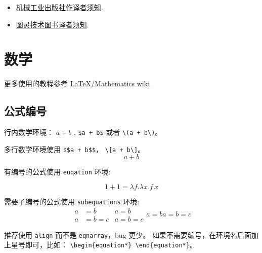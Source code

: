 \begin{itemize}
\item \href{http://www.cmpbook.com/index.php?id=131}{机械工业出版社作译者须知}.
\item \href{http://www.ituring.com.cn/article/501527}{图灵技术图书译者须知}.
\end{itemize}

\section{数学}

更多使用的教程参考 \href{https://en.wikibooks.org/wiki/LaTeX/Mathematics}{\LaTeX/Mathematics wiki}

\subsection{公式编号}

行内数学环境： $a + b$ , \verb!$a + b$! 或者 \verb!\(a + b\)!。

多行数学环境使用 \verb!$$a + b$$!，  \verb!\[a + b\]!。
$$a + b$$

有编号的公式使用 \texttt{euqation} 环境:

\begin{equation}\label{euqation:one_plus_one}
    1 + 1 = \lambda f . \lambda x . f\, x
\end{equation}


需要子编号的公式使用 \texttt{subequations} 环境:
\begin{subequations}
    \begin{align} %
        a &= b \\
        a &= b = c
    \end{align}
    \begin{gather}
        a = b\\
        a = b = c
    \end{gather}
    \begin{equation}
        a = b
    \end{equation}
    \begin{equation}
        a = b = c
    \end{equation}
\end{subequations}

推荐使用 \texttt{align} 而不是 \texttt{eqnarray}，bug 更少。
如果不需要编号，在环境名后面加上星号即可，比如： \verb!\begin{equation*} \end{equation*}!。

